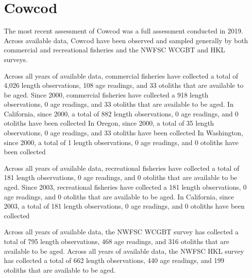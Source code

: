 \documentclass[11pt,
  english,
  letterpaper,
]{article}
\begin{document}

\hypertarget{cowcod}{%
\section{Cowcod}\label{cowcod}}

\leavevmode\tagmcend\tagstructend


The most recent assessment of Cowcod was a full assessment conducted in 2019. Across available data, Cowcod have been observed and sampled generally by both commercial and recreational fisheries and the NWFSC WCGBT and HKL surveys.

\leavevmode\tagmcend\tagstructend\par


Across all years of available data, commercial fisheries have collected a total of 4,026 length observations, 108 age readings, and 33 otoliths that are available to be aged. Since 2000, commercial fisheries have collected a 918 length observations, 0 age readings, and 33 otoliths that are available to be aged. In California, since 2000, a total of 882 length observations, 0 age readings, and 0 otoliths have been collected In Oregon, since 2000, a total of 35 length observations, 0 age readings, and 33 otoliths have been collected In Washington, since 2000, a total of 1 length observations, 0 age readings, and 0 otoliths have been collected

\leavevmode\tagmcend\tagstructend\par


Across all years of available data, recreational fisheries have collected a total of 181 length observations, 0 age readings, and 0 otoliths that are available to be aged. Since 2003, recreational fisheries have collected a 181 length observations, 0 age readings, and 0 otoliths that are available to be aged. In California, since 2003, a total of 181 length observations, 0 age readings, and 0 otoliths have been collected

\leavevmode\tagmcend\tagstructend\par


Across all years of available data, the NWFSC WCGBT survey has collected a total of 795 length observations, 468 age readings, and 316 otoliths that are available to be aged. Across all years of available data, the NWFSC HKL survey has collected a total of 662 length observations, 440 age readings, and 199 otoliths that are available to be aged.
\end{document}
